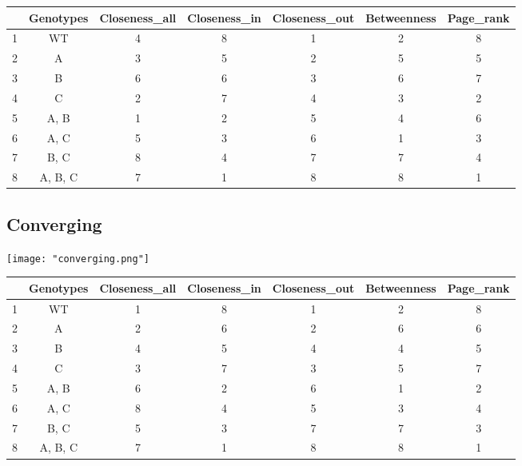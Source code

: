 \documentclass[12pt, a4paper]{article}
\begin{document}
\begin{table}[ht]
  \centering
  \begin{tabular}{c|c|ccccc}
    \toprule
   & Genotypes & Closeness\_all & Closeness\_in & Closeness\_out & Betweenness & Page\_rank \\ 
    \midrule
  1 & WT &   4 &   8 &   1 &   2 &   8 \\ 
     \rowcolor[gray]{0.95}2 & A &   3 &   5 &   2 &   5 &   5 \\ 
    3 & B &   6 &   6 &   3 &   6 &   7 \\ 
     \rowcolor[gray]{0.95}4 & C &   2 &   7 &   4 &   3 &   2 \\ 
    5 & A, B &   1 &   2 &   5 &   4 &   6 \\ 
     \rowcolor[gray]{0.95}6 & A, C &   5 &   3 &   6 &   1 &   3 \\ 
    7 & B, C &   8 &   4 &   7 &   7 &   4 \\ 
     \rowcolor[gray]{0.95}8 & A, B, C &   7 &   1 &   8 &   8 &   1 \\ 
     \bottomrule
  \end{tabular}
  \end{table}

\pagebreak  
\subsection{Converging}
\begin{center}
  \texttt{[image: "converging.png"]}
\end{center}

\begin{table}[ht]
  \centering
  \begin{tabular}{c|c|ccccc}
    \toprule
   & Genotypes & Closeness\_all & Closeness\_in & Closeness\_out & Betweenness & Page\_rank \\ 
    \midrule
  1 & WT &   1 &   8 &   1 &   2 &   8 \\ 
     \rowcolor[gray]{0.95}2 & A &   2 &   6 &   2 &   6 &   6 \\ 
    3 & B &   4 &   5 &   4 &   4 &   5 \\ 
     \rowcolor[gray]{0.95}4 & C &   3 &   7 &   3 &   5 &   7 \\ 
    5 & A, B &   6 &   2 &   6 &   1 &   2 \\ 
     \rowcolor[gray]{0.95}6 & A, C &   8 &   4 &   5 &   3 &   4 \\ 
    7 & B, C &   5 &   3 &   7 &   7 &   3 \\ 
     \rowcolor[gray]{0.95}8 & A, B, C &   7 &   1 &   8 &   8 &   1 \\ 
     \bottomrule
  \end{tabular}
  \end{table}
\end{document}
